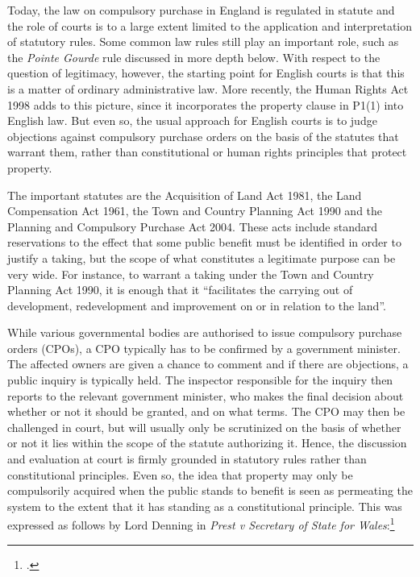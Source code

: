 Today, the law on compulsory purchase in England is regulated in statute and the role of courts is to a large extent limited to the application and interpretation of statutory rules. Some common law rules still play an important role, such as the {\it Pointe Gourde} rule discussed in more depth below. With respect to the question of legitimacy, however, the starting point for English courts is that this is a matter of ordinary administrative law. More recently, the Human Rights Act 1998 adds to this picture, since it incorporates the property clause in P1(1) into English law. But even so, the usual approach for English courts is to judge objections against compulsory purchase orders on the basis of the statutes that warrant them, rather than constitutional or human rights principles that protect property.

The important statutes are the Acquisition of Land Act 1981, the Land Compensation Act 1961, the Town and Country Planning Act 1990 and the Planning and Compulsory Purchase Act 2004. These acts include standard reservations to the effect that some public benefit must be identified in order to justify a taking, but the scope of what constitutes a legitimate purpose can be very wide. For instance, to warrant a taking under the Town and Country Planning Act 1990, it is enough that it ``facilitates the carrying out of development, redevelopment and improvement on or in relation to the land''. 

While various governmental bodies are authorised to issue compulsory purchase orders (CPOs), a CPO typically has to be confirmed by a government minister. The affected owners are given a chance to comment and if there are objections, a public inquiry is typically held. The inspector responsible for the inquiry then reports to the relevant government minister, who makes the final decision about whether or not it should be granted, and on what terms. The CPO may then be challenged in court, but will usually only be scrutinized on the basis of whether or not it lies within the scope of the statute authorizing it. Hence, the discussion and evaluation at court is firmly grounded in statutory rules rather than constitutional principles. Even so, the idea that property may only be compulsorily acquired when the public stands to benefit is seen as permeating the system to the extent that it has standing as a constitutional principle. This was expressed as follows by Lord Denning in {\it Prest v Secretary of State for Wales}:\footcite{prest82}

